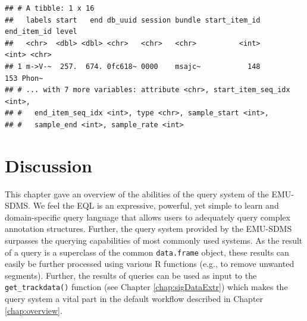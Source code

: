 \documentclass[]{book}
\begin{document}
\begin{verbatim}
## # A tibble: 1 x 16
##   labels start   end db_uuid session bundle start_item_id end_item_id level
##   <chr>  <dbl> <dbl> <chr>   <chr>   <chr>          <int>       <int> <chr>
## 1 m->V-~  257.  674. 0fc618~ 0000    msajc~           148         153 Phon~
## # ... with 7 more variables: attribute <chr>, start_item_seq_idx <int>,
## #   end_item_seq_idx <int>, type <chr>, sample_start <int>,
## #   sample_end <int>, sample_rate <int>
\end{verbatim}

\hypertarget{discussion}{%
\section{Discussion}\label{discussion}}

This chapter gave an overview of the abilities of the query system of the EMU-SDMS. We feel the EQL is an expressive, powerful, yet simple to learn and domain-specific query language that allows users to adequately query complex annotation structures. Further, the query system provided by the EMU-SDMS surpasses the querying capabilities of most commonly used systems. As the result of a query is a superclass of the common \texttt{data.frame} object, these results can easily be further processed using various R functions (e.g., to remove unwanted segments). Further, the results of queries can be used as input to the \texttt{get\_trackdata()} function (see Chapter \ref{chap:sigDataExtr}) which makes the query system a vital part in the default workflow described in Chapter \ref{chap:overview}.
\end{document}
